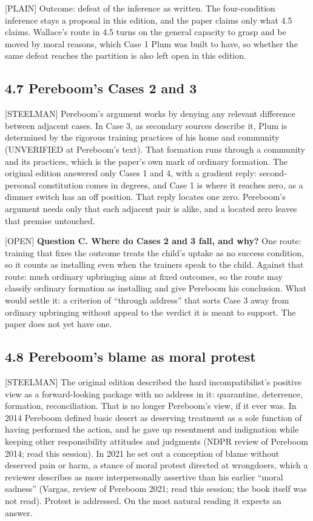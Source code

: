 \documentclass[11pt]{article}
\newcommand{\register}[1]{{\ttfamily\small #1}}
\begin{document}
\register{[PLAIN]} Outcome: defeat of the inference as written. The four-condition inference stays a proposal in this edition, and the paper claims only what 4.5 claims. Wallace's route in 4.5 turns on the general capacity to grasp and be moved by moral reasons, which Case 1 Plum was built to have, so whether the same defeat reaches the partition is also left open in this edition.

\subsection*{4.7 Pereboom's Cases 2 and 3}

\register{[STEELMAN]} Pereboom's argument works by denying any relevant difference between adjacent cases. In Case 3, as secondary sources describe it, Plum is determined by the rigorous training practices of his home and community (UNVERIFIED at Pereboom's text). That formation runs through a community and its practices, which is the paper's own mark of ordinary formation. The original edition answered only Cases 1 and 4, with a gradient reply: second-personal constitution comes in degrees, and Case 1 is where it reaches zero, as a dimmer switch has an off position. That reply locates one zero. Pereboom's argument needs only that each adjacent pair is alike, and a located zero leaves that premise untouched.

\register{[OPEN]} \textbf{Question C. Where do Cases 2 and 3 fall, and why?} One route: training that fixes the outcome treats the child's uptake as no success condition, so it counts as installing even when the trainers speak to the child. Against that route: much ordinary upbringing aims at fixed outcomes, so the route may classify ordinary formation as installing and give Pereboom his conclusion. What would settle it: a criterion of ``through address'' that sorts Case 3 away from ordinary upbringing without appeal to the verdict it is meant to support. The paper does not yet have one.

\subsection*{4.8 Pereboom's blame as moral protest}

\register{[STEELMAN]} The original edition described the hard incompatibilist's positive view as a forward-looking package with no address in it: quarantine, deterrence, formation, reconciliation. That is no longer Pereboom's view, if it ever was. In 2014 Pereboom defined basic desert as deserving treatment as a sole function of having performed the action, and he gave up resentment and indignation while keeping other responsibility attitudes and judgments (NDPR review of Pereboom 2014; read this session). In 2021 he set out a conception of blame without deserved pain or harm, a stance of moral protest directed at wrongdoers, which a reviewer describes as more interpersonally assertive than his earlier ``moral sadness'' (Vargas, review of Pereboom 2021; read this session; the book itself was not read). Protest is addressed. On the most natural reading it expects an answer.
\end{document}
